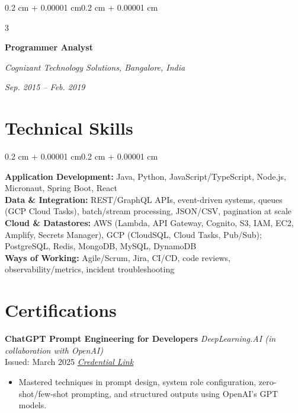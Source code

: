 \documentclass[10pt]{article}
\newenvironment{onecolentry}{
    \begin{adjustwidth}{0.2 cm + 0.00001 cm}{0.2 cm + 0.00001 cm}
}{
    \end{adjustwidth}
}
\newenvironment{threecolentry}[3]{
    \onecolentry
    \def\firstColumn{#1}
    \def\secondColumn{#2}
    \def\thirdColumn{#3}
    \setcolumnwidth{6cm, 11.5cm, 5cm}
    \begin{paracol}{3}
    \firstColumn
}{
    \switchcolumn[1] \centering \secondColumn
    \switchcolumn[2] \raggedleft \thirdColumn
    \end{paracol}
    \endonecolentry
}
\let\hrefWithoutArrow\href
\renewcommand{\href}[2]{\hrefWithoutArrow{#1}{#2}}
\begin{document}
        \begin{threecolentry}{
            \raggedright\textbf{Programmer Analyst}
            }{
            \centering\textit{Cognizant Technology Solutions, Bangalore, India}
            }{
            \raggedleft\textit{Sep. 2015 -- Feb. 2019}
            }
        \end{threecolentry}


    \section{Technical Skills}

        \begin{onecolentry}
            \textbf{Application Development:} Java, Python, JavaScript/TypeScript, Node.js, Micronaut, Spring Boot, React\\
            \textbf{Data \& Integration:} REST/GraphQL APIs, event-driven systems, queues (GCP Cloud Tasks), batch/stream processing, JSON/CSV, pagination at scale\\
            \textbf{Cloud \& Datastores:} AWS (Lambda, API Gateway, Cognito, S3, IAM, EC2, Amplify, Secrets Manager), GCP (CloudSQL, Cloud Tasks, Pub/Sub); PostgreSQL, Redis, MongoDB, MySQL, DynamoDB\\
            \textbf{Ways of Working:} Agile/Scrum, Jira, CI/CD, code reviews, observability/metrics, incident troubleshooting
        \end{onecolentry}

    \section{Certifications}

        \textbf{ChatGPT Prompt Engineering for Developers} \hfill \textit{DeepLearning.AI (in collaboration with OpenAI)}\\
        Issued: March 2025 \hfill \hrefWithoutArrow{https://learn.deeplearning.ai/accomplishments/14072d88-ddc5-4d95-a3a3-dd9af170762a?usp=sharing}{\textit{Credential Link}}
        \begin{itemize}[leftmargin=*, topsep=2pt, itemsep=2pt]
            \item Mastered techniques in prompt design, system role configuration, zero-shot/few-shot prompting, and structured outputs using OpenAI's GPT models.
        \end{itemize}
\end{document}
